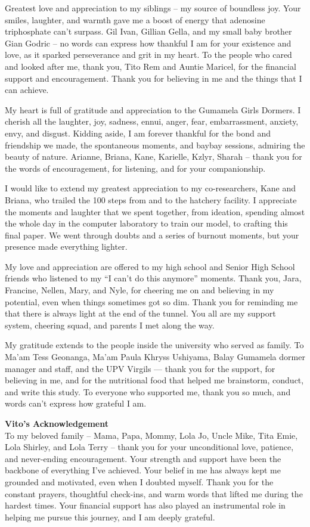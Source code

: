 Greatest love and appreciation to my siblings – my source of boundless joy. Your smiles, laughter, and warmth gave me a boost of energy that adenosine triphosphate can’t surpass. Gil Ivan, Gillian Gella, and my small baby brother Gian Godric – no words can express how thankful I am for your existence and love, as it sparked perseverance and grit in my heart.
To the people who cared and looked after me, thank you, Tito Rem and Auntie Maricel, for the financial support and encouragement. Thank you for believing in me and the things that I can achieve.

My heart is full of gratitude and appreciation to the Gumamela Girls Dormers. I cherish all the laughter, joy, sadness, ennui, anger, fear, embarrassment, anxiety, envy, and disgust. Kidding aside, I am forever thankful for the bond and friendship we made, the spontaneous moments, and baybay sessions, admiring the beauty of nature. Arianne, Briana, Kane, Karielle, Kzlyr, Sharah – thank you for the words of encouragement, for listening, and for your companionship.

I would like to extend my greatest appreciation to my co-researchers, Kane and Briana, who trailed the 100 steps from and to the hatchery facility. I appreciate the moments and laughter that we spent together, from ideation, spending almost the whole day in the computer laboratory to train our model, to crafting this final paper. We went through doubts and a series of burnout moments, but your presence made everything lighter.

My love and appreciation are offered to my high school and Senior High School friends who listened to my “I can’t do this anymore” moments. Thank you, Jara, Francine, Nellen, Mary, and Nyle, for cheering me on and believing in my potential, even when things sometimes got so dim. Thank you for reminding me that there is always light at the end of the tunnel. You all are my support system, cheering squad, and parents I met along the way.

My gratitude extends to the people inside the university who served as family. To Ma’am Tess Geonanga, Ma’am Paula Khryss Ushiyama, Balay Gumamela dormer manager and staff, and the UPV Virgils — thank you for the support, for believing in me, and for the nutritional food that helped me brainstorm, conduct, and write this study.
To everyone who supported me, thank you so much, and words can’t express how grateful I am.

\textbf{Vito's Acknowledgement} \\
To my beloved family – Mama, Papa, Mommy, Lola Jo, Uncle Mike, Tita Emie, Lola Shirley, and Lola Terry – thank you for your unconditional love, patience, and never-ending encouragement. Your strength and support have been the backbone of everything I’ve achieved. Your belief in me has always kept me grounded and motivated, even when I doubted myself. Thank you for the constant prayers, thoughtful check-ins, and warm words that lifted me during the hardest times. Your financial support has also played an instrumental role in helping me pursue this journey, and I am deeply grateful.

